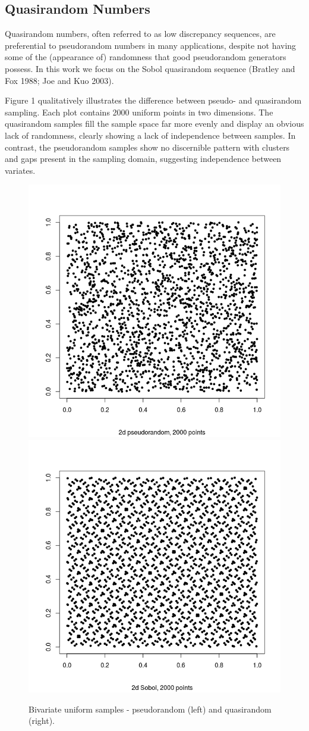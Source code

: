 \documentclass[]{article}
\begin{document}
\subsection{Quasirandom Numbers}\label{quasirandom-numbers}

Quasirandom numbers, often referred to as low discrepancy sequences, are
preferential to pseudorandom numbers in many applications, despite not
having some of the (appearance of) randomness that good pseudorandom
generators possess. In this work we focus on the Sobol quasirandom
sequence (Bratley and Fox 1988; Joe and Kuo 2003).

Figure 1 qualitatively illustrates the difference between pseudo- and
quasirandom sampling. Each plot contains 2000 uniform points in two
dimensions. The quasirandom samples fill the sample space far more
evenly and display an obvious lack of randomness, clearly showing a lack
of independence between samples. In contrast, the pseudorandom samples
show no discernible pattern with clusters and gaps present in the
sampling domain, suggesting independence between variates.

\begin{figure}[H]
\includegraphics[width=0.5\linewidth]{figures/pseudo2d} \includegraphics[width=0.5\linewidth]{figures/quasi2d} \caption{Bivariate uniform samples -  pseudorandom (left) and quasirandom (right).}\label{fig:unnamed-chunk-1}
\end{figure}
\end{document}
